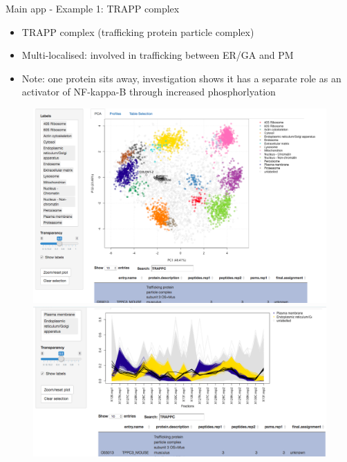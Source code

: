 \documentclass[bigger]{beamer}
\begin{document}
\begin{frame}{Main app - Example 1: TRAPP complex}
\smallskip
\footnotesize {
  \begin{itemize}
  \item TRAPP complex (trafficking protein particle complex)
  \item Multi-localised: involved in trafficking between ER/GA and PM
  \item Note: one protein sits away, investigation shows it has a separate  role
  as an activator of NF-kappa-B through increased phosphorlyation
  \end{itemize}
  }
  \begin{figure}
    \includegraphics[width=.5\linewidth]{Figures/demo1-trapp-pca.png}
    \includegraphics[width=.5\linewidth]{Figures/demo1-trapp-profiles.png}
  \end{figure}
\end{frame}
\end{document}

